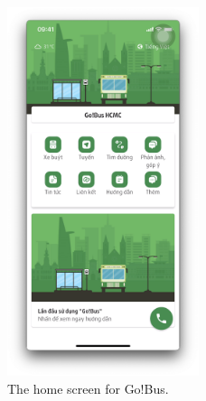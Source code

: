 \begin{figure}[H]
    \centering
    \includegraphics[width=0.5\textwidth]{assets/images/Research/Bus/gobus_home.png}
    \caption{The home screen for Go!Bus.}
    \label{fig:gobus_homescreen}
\end{figure}

